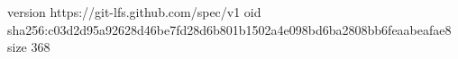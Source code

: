 version https://git-lfs.github.com/spec/v1
oid sha256:c03d2d95a92628d46be7fd28d6b801b1502a4e098bd6ba2808bb6feaabeafae8
size 368
